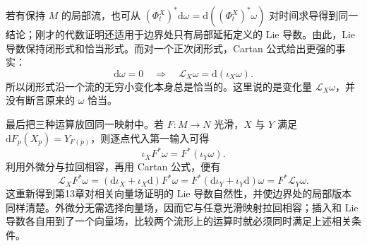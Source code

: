 若有保持 \(M\) 的局部流，也可从 \((\Phi_t^X)^*\mathrm{d}\omega=\mathrm{d}((\Phi_t^X)^*\omega)\) 对时间求导得到同一结论；刚才的代数证明还适用于边界处只有局部延拓定义的 Lie 导数。由此，Lie 导数保持闭形式和恰当形式。而对一个正次闭形式，Cartan 公式给出更强的事实：
\[
	\mathrm{d}\omega=0\quad\Longrightarrow\quad \mathcal L_X\omega=\mathrm{d}(\iota_X\omega).
\]
所以闭形式沿一个流的无穷小变化本身总是恰当的。这里说的是变化量 \(\mathcal L_X\omega\)，并没有断言原来的 \(\omega\) 恰当。

\ProseParagraphBreak

最后把三种运算放回同一映射中。若 \(F:M\to N\) 光滑，\(X\) 与 \(Y\) 满足 \(\mathrm{d}F_p(X_p)=Y_{F(p)}\)，则逐点代入第一输入可得
\[
	\iota_XF^*\omega=F^*(\iota_Y\omega).
\]
利用外微分与拉回相容，再用 Cartan 公式，便有
\[
	\mathcal L_XF^*\omega
	=(\mathrm{d}\iota_X+\iota_X\mathrm{d})F^*\omega
	=F^*(\mathrm{d}\iota_Y+\iota_Y\mathrm{d})\omega
	=F^*\mathcal L_Y\omega.
\]
这重新得到第13章对相关向量场证明的 Lie 导数自然性，并使边界处的局部版本同样清楚。外微分无需选择向量场，因而它与任意光滑映射拉回相容；插入和 Lie 导数各自用到了一个向量场，比较两个流形上的运算时就必须同时满足上述相关条件。
